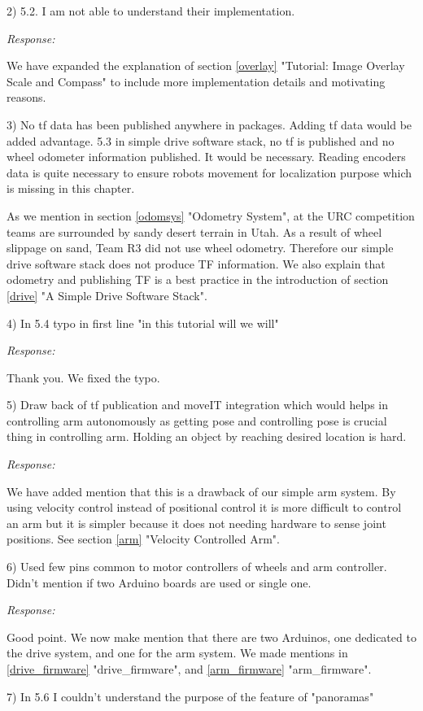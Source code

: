 \documentclass[runningheads,a4paper]{llncs}
\newcommand{\rsp}{\noindent \textit{Response:}}
\begin{document}
2)  5.2. I am not able to understand their implementation.

\rsp

We have expanded the explanation of section \ref{overlay} "Tutorial: Image Overlay Scale and Compass" to include more implementation details and motivating reasons.

3)  No tf data has been published anywhere in packages. Adding tf data would be added advantage. 5.3 in simple drive software stack, no tf is published and no wheel odometer information  published. It would be necessary. Reading encoders data is quite necessary to ensure robots movement for localization purpose which is missing in this chapter.

As we mention in section \ref{odomsys} "Odometry System", at the URC competition teams are surrounded by sandy desert terrain in Utah. As a result of wheel slippage on sand, Team R3 did not use wheel odometry. Therefore our simple drive software stack does not produce TF information. We also explain that odometry and publishing TF is a best practice in the introduction of section \ref{drive} "A Simple Drive Software Stack".

4)  In 5.4 typo in first line "in this tutorial will we will"

\rsp

Thank you. We fixed the typo.

5)  Draw back of tf publication and moveIT integration which would helps in controlling arm autonomously as getting pose and controlling pose is crucial thing in controlling arm. Holding an object by reaching desired location is hard.

\rsp

We have added mention that this is a drawback of our simple arm system. By using velocity control instead of positional control it is more difficult to control an arm but it is simpler because it does not needing hardware to sense joint positions. See section \ref{arm} "Velocity Controlled Arm".

6)  Used few pins common to motor controllers of wheels and arm controller. Didn't mention if two Arduino boards are used or single one.

\rsp

Good point. We now make mention that there are two Arduinos, one dedicated to the drive system, and one for the arm system. We made mentions in \ref{drive_firmware} "drive\_firmware", and \ref{arm_firmware} "arm\_firmware". 

7)  In 5.6 I couldn't understand the purpose of the feature of "panoramas"
\end{document}
